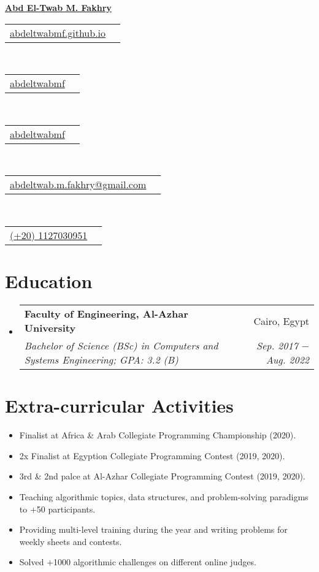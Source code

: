 \documentclass[letterpaper, 11pt]{article}
\makeatletter
\newcommand{\education}[5] {
  \vspace{-1pt}\item
  \begin{tabular*}{0.97\textwidth}[t]{l@{\extracolsep{\fill}}r}
    #1 \textbf{#2} & #3 \\
    \textit{\small #4} & \textit{\small #5} \\
  \end{tabular*}
  \vspace{-4pt}
}
\newcommand{\extracurricularactivity}[3] {
\item\small
  {#1}
  \href{#2}{\color{RoyalBlue}#3}
  \vspace{-4pt}
}
\newcommand{\name}[2] {
  \textbf{
    \href{#1}{\Huge{#2}}
  }
  \vspace{-8pt}
}
\newcommand{\contact}[4] {
  \begin{tabular}{lr}
    {\href{#1}{\color{#3} #2 #4}}
  \end{tabular}
  \vspace{-4pt}
}
\makeatother
\begin{document}
\name{https://abdeltwabmf.github.io}{Abd El-Twab M. Fakhry}

\begin{center}
  \small
  \contact
  {https://abdeltwabmf.github.io}
  {\faIcon{globe}}{RoyalBlue}{abdeltwabmf.github.io}\,
  \contact
  {https://www.linkedin.com/in/abdeltwabmf}
  {\faIcon{linkedin}}{RoyalBlue}{abdeltwabmf}\,
  \contact
  {https://github.com/AbdeltwabMF}
  {\faIcon{github}}{RoyalBlue}{abdeltwabmf}\,
  \contact
  {mailto:abdeltwab.m.fakhry@gmail.com}
  {\faIcon{envelope}}{RoyalBlue}{abdeltwab.m.fakhry@gmail.com}\,
  \contact
  {tel:+201127030951}
  {\faIcon{mobile-alt}}{RoyalBlue}{(+20) 1127030951}
\end{center}\vspace{8pt}

\section{Education}
\begin{itemize}[leftmargin=*]
  \education
  {\faIcon{university}}
  {Faculty of Engineering, Al-Azhar University}{ Cairo, Egypt}
  {Bachelor of Science (BSc) in Computers and Systems Engineering; GPA: 3.2 (B)}{ Sep. 2017 $-$ Aug. 2022}
\end{itemize}

\section{Extra-curricular Activities}
\begin{itemize}[leftmargin=*]
  \extracurricularactivity
  {Finalist at Africa \& Arab Collegiate Programming Championship (2020).}
  {https://icpc.global/ICPCID/S6R4YNB7PW7D}{\faIcon{link}}

  \extracurricularactivity
  {2x Finalist at Egyption Collegiate Programming Contest (2019, 2020).}
  {}{}

  \extracurricularactivity
  {3rd \& 2nd palce at Al-Azhar Collegiate Programming Contest (2019, 2020).}
  {}{}

  \extracurricularactivity
  {Teaching algorithmic topics, data structures, and problem-solving paradigms to +50 participants.}
  {https://sites.google.com/view/azharicpc/home}{\faIcon{link}}

  \extracurricularactivity
  {Providing multi-level training during the year and writing problems for weekly sheets and contests.}
  {}{}

  \extracurricularactivity
  {Solved +1000 algorithmic challenges on different online judges.}
  {}{}
 \end{itemize}
\end{document}

